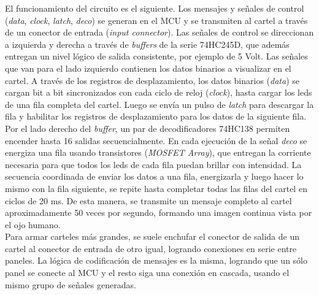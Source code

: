 El funcionamiento del circuito es el siguiente. Los mensajes y señales de control (\textit{data}, \textit{clock}, \textit{latch}, \textit{deco}) se generan en el MCU y se transmiten al cartel a través de un conector de entrada (\textit{input connector}). Las señales de control se direccionan a izquierda y derecha a través de \textit{buffers} de la serie 74HC245D, que además entregan un nivel lógico de salida consistente, por ejemplo de 5 Volt. Las señales que van para el lado izquierdo contienen los datos binarios a visualizar en el cartel. A través de los registros de desplazamiento, los datos binarios (\textit{data}) se cargan bit a bit sincronizados con cada ciclo de reloj (\textit{clock}), hasta cargar los leds de una fila completa del cartel. Luego se envía un pulso de \textit{latch} para descargar la fila y habilitar los registros de desplazamiento para los datos de la siguiente fila. Por el lado derecho del \textit{buffer},  un par de decodificadores 74HC138 permiten encender hasta 16 salidas secuencialmente. En cada ejecución de la señal \textit{deco} se energiza una fila usando transistores (\textit{MOSFET Array}), que entregan la corriente necesaria para que todos los leds de cada fila puedan brillar con intensidad. La secuencia coordinada de enviar los datos a una fila, energizarla y luego hacer lo mismo con la fila siguiente, se repite hasta completar todas las filas del cartel en ciclos de 20 ms. De esta manera, se transmite un mensaje completo al cartel aproximadamente 50 veces por segundo, formando una imagen continua vista por el ojo humano.\\

 Para armar carteles más grandes, se suele enchufar el conector de salida de un cartel al conector de entrada de otro igual, logrando conexiones en serie entre paneles. La lógica de codificación de mensajes es la misma, logrando que un sólo panel se conecte al MCU y el resto siga una conexión en cascada, usando el mismo grupo de señales generadas.\\
 
